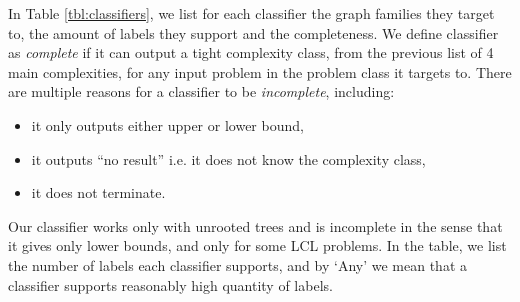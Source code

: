 In Table \ref{tbl:classifiers}, we list for each classifier the graph families they target to, the amount of labels they support and the completeness.
We define classifier as \emph{complete} if it can output a tight complexity class, from the previous list of 4 main complexities, for any input problem in the problem class it targets to.
There are multiple reasons for a classifier to be \emph{incomplete}, including:
\begin{itemize}
    \item it only outputs either upper or lower bound,
    \item it outputs ``no result'' i.e. it does not know the complexity class,
    \item it does not terminate.
\end{itemize}
Our classifier works only with unrooted trees and is incomplete in the sense that it gives only lower bounds, and only for some LCL problems.
In the table, we list the number of labels each classifier supports, and by `Any' we mean that a classifier supports reasonably high quantity of labels.
